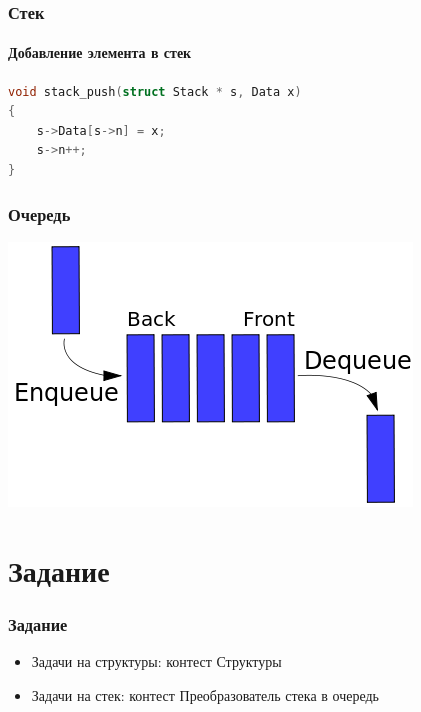 \documentclass[12pt,pdf,hyperref={unicode}]{beamer}
\begin{document}
\begin{frame}[fragile]
\frametitle{Стек} 
\framesubtitle{Добавление элемента в стек} 

\begin{lstlisting}[language=C++,basicstyle=\ttfamily,keywordstyle=\color{blue}]
void stack_push(struct Stack * s, Data x)
{
    s->Data[s->n] = x;
    s->n++;
}
\end{lstlisting}
\end{frame}


\begin{frame}[fragile]
\frametitle{Очередь} 
\begin{center}
\includegraphics[width=0.8\linewidth]{images/queue.png}
\end{center}
\end{frame}



\section{Задание}

\begin{frame}[fragile]
\frametitle{Задание} 
\begin{itemize}
\item Задачи на структуры: контест Структуры
\item Задачи на стек: контест Преобразователь стека в очередь
\end{itemize}
\end{frame}
\end{document}
